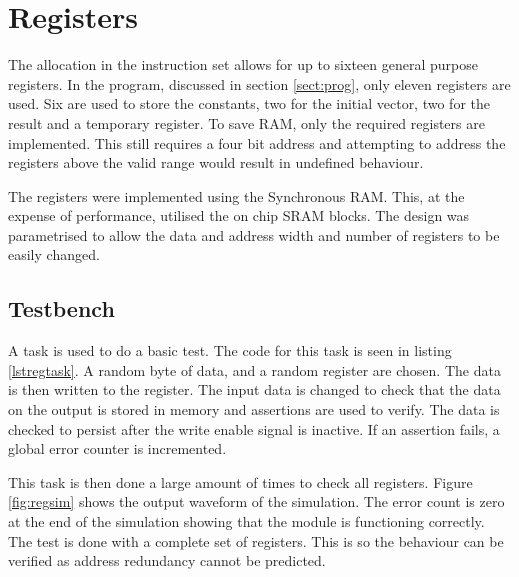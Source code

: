 
\section{Registers}\label{sect:regs}

The allocation in the instruction set allows for up to sixteen general purpose registers. 
In the program, discussed in section \ref{sect:prog}, only eleven registers are used. 
Six are used to store the constants, two for the initial vector, two for the result and a temporary register.
To save RAM, only the required registers are implemented.
This still requires a four bit address and attempting to address the registers above the valid range would result in undefined behaviour.

The registers were implemented using the Synchronous RAM.
This, at the expense of performance, utilised the on chip SRAM blocks. 
The design was parametrised to allow the data and address width and number of registers to be easily changed. 


\subsection{Testbench}

A task is used to do a basic test.
The code for this task is seen in listing \ref{lstregtask}.
A random byte of data, and a random register are chosen. 
The data is then written to the register. 
The input data is changed to check that the data on the output is stored in memory and assertions are used to verify. 
The data is checked to persist after the write enable signal is inactive. 
If an assertion fails, a global error counter is incremented.

This task is then done a large amount of times to check all registers. 
Figure \ref{fig:regsim} shows the output waveform of the simulation. 
The error count is zero at the end of the simulation showing that the module is functioning correctly.
The test is done with a complete set of registers. 
This is so the behaviour can be verified as address redundancy cannot be predicted.





